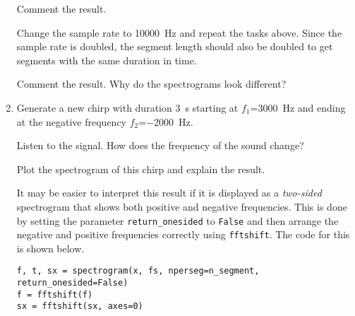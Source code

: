 \begin{enumerate}
	Comment the result.
	
	Change the sample rate to \qty{10000}{Hz} and repeat the tasks above. Since the sample rate is doubled, the segment length should also be doubled to get segments with the same duration in time.
	
	Comment the result. Why do the spectrograms look different?
	

	
\item Generate a new chirp with duration \qty{3}{s} starting at $f_1$=\qty{3000}{Hz} and ending at the negative frequency $f_2$=\qty{-2000}{Hz}.
	
	Listen to the signal. How does the frequency of the sound change?
	
	Plot the spectrogram of this chirp and explain the result.
	
	It may be easier to interpret this result if it is displayed as a \emph{two-sided} spectrogram that shows both positive and negative frequencies.	
	This is done by setting the parameter \verb|return_onesided| to \verb|False| and then arrange the negative and positive frequencies correctly using \verb|fftshift|.
	The code for this is shown below.	
	
\begin{lstlisting}[style=pythonstyle]		
f, t, sx = spectrogram(x, fs, nperseg=n_segment, return_onesided=False)
f = fftshift(f)
sx = fftshift(sx, axes=0)
\end{lstlisting}
	
\end{enumerate}

